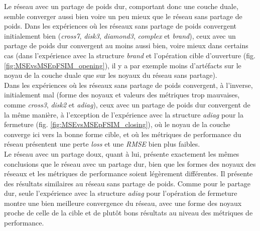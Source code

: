 \newpage


Le réseau avec un partage de poids dur, comportant donc une couche duale, semble converger aussi bien voire un peu mieux que le réseau sans partage de poids. Dans les expériences où les réseaux sans partage de poids convergent initialement bien (\textit{cross7}, \textit{disk3}, \textit{diamond3}, \textit{complex} et \textit{brand}), ceux avec un partage de poids dur convergent au moins aussi bien, voire mieux dans certains cas (dans l'expérience avec la structure \textit{brand} et l'opération cible d'ouverture (fig. \ref{fig:MSEvsMSEpFSIM_opening}), il y a par exemple moins d'artéfacts sur le noyau de la couche duale que sur les noyaux du réseau sans partage). \\

\vspace{-3.0mm}
\noindent Dans les expériences où les réseaux sans partage de poids convergent, à l'inverse, initialement mal (forme des noyaux et valeurs des métriques trop mauvaises, comme \textit{cross3}, \textit{disk2} et \textit{adiag}), ceux avec un partage de poids dur convergent de la même manière, à l'exception de l'expérience avec la structure \textit{adiag} pour la fermeture (fig. \ref{fig:MSEvsMSEpFSIM_closing}), où le noyau de la couche converge ici vers la bonne forme cible, et où les métriques de performance du réseau présentent une perte \textit{loss} et une \textit{RMSE} bien plus faibles. \\

\vspace{-2.0mm}
Le réseau avec un partage doux, quant à lui, présente exactement les mêmes conclusions que le réseau avec un partage dur, bien que les formes des noyaux des réseaux et les métriques de performance soient légèrement différentes. Il présente des résultats similaires au réseau sans partage de poids. Comme pour le partage dur, seule l'expérience avec la structure \textit{adiag} pour l'opération de fermeture montre une bien meilleure convergence du réseau, avec une forme des noyaux proche de celle de la cible et de plutôt bons résultats au niveau des métriques de performance. \\

